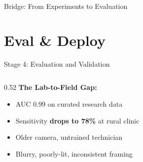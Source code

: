 \documentclass[aspectratio=169, 12pt]{beamer}
\begin{document}
\begin{frame}{Bridge: From Experiments to Evaluation}
\end{frame}

\section{Eval \& Deploy}

\begin{frame}{Stage 4: Evaluation and Validation}
\note{
%
%
%
%
}

\small
\begin{columns}[T]
  \begin{column}{0.52\textwidth}
    \textbf{The Lab-to-Field Gap:}
    \begin{itemize}\setlength\itemsep{0pt}
      \item AUC 0.99 on curated research data
      \item Sensitivity \textbf{drops to 78\%} at rural clinic
      \item Older camera, untrained technician
      \item Blurry, poorly-lit, inconsistent framing
    \end{itemize}


\end{column}
\end{columns}
\end{frame}
\end{document}
